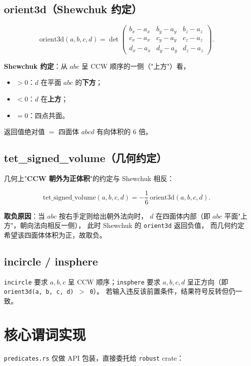 \documentclass[11pt,a4paper]{article}
\begin{document}
\subsection{orient3d（Shewchuk 约定）}

\[
  \text{orient3d}(a, b, c, d) =
  \det\begin{pmatrix}
    b_x - a_x & b_y - a_y & b_z - a_z \\
    c_x - a_x & c_y - a_y & c_z - a_z \\
    d_x - a_x & d_y - a_y & d_z - a_z
  \end{pmatrix}.
\]

\textbf{Shewchuk 约定}：从 $abc$ 呈 CCW 顺序的一侧（"上方"）看，
\begin{itemize}
  \item $> 0$：$d$ 在平面 $abc$ 的\textbf{下方}；
  \item $< 0$：$d$ 在\textbf{上方}；
  \item $= 0$：四点共面。
\end{itemize}
返回值绝对值 $=$ 四面体 $abcd$ 有向体积的 6 倍。

\subsection{tet\_signed\_volume（几何约定）}

几何上"\textbf{CCW 朝外为正体积}"的约定与 Shewchuk 相反：

\[
  \text{tet\_signed\_volume}(a, b, c, d) =
  -\frac{1}{6}\,\text{orient3d}(a, b, c, d).
\]

\textbf{取负原因}：当 $abc$ 按右手定则给出朝外法向时，
$d$ 在四面体内部（即 $abc$ 平面"上方"，朝向法向相反一侧），
此时 Shewchuk 的 \texttt{orient3d} 返回负值，
而几何约定希望该四面体体积为正，故取负。

\subsection{incircle / insphere}

\texttt{incircle} 要求 $a, b, c$ 呈 CCW 顺序；\texttt{insphere} 要求
$a, b, c, d$ 呈正方向（即 \texttt{orient3d(a, b, c, d) $>$ 0}）。
若输入违反该前置条件，结果符号反转但仍一致。

\section{核心谓词实现}

\texttt{predicates.rs} 仅做 API 包装，直接委托给 \texttt{robust} crate：
\end{document}
